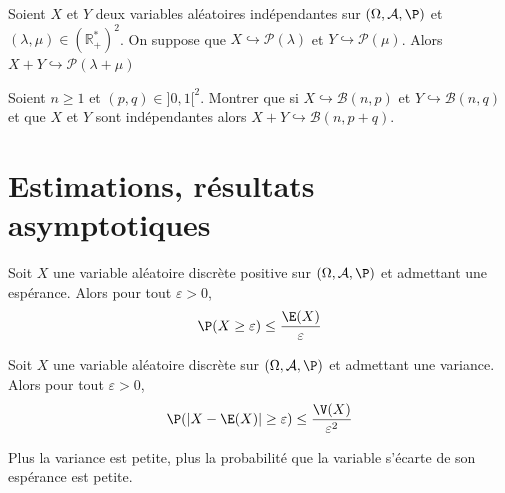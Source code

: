 \documentclass[a4paper,10pt]{report}
\begin{document}
\begin{cor} Soient $X$ et $Y$ deux variables aléatoires indépendantes sur $(\Omega, \mathcal{A}, \P)$ et $(\lambda, \mu) \in (\mathbb{R}_+^{*})^2$. On suppose que $X \hookrightarrow \mathcal{P}(\lambda)$ et $Y \hookrightarrow \mathcal{P}(\mu)$. Alors $X+Y \hookrightarrow \mathcal{P}(\lambda+\mu)$
\end{cor}

\begin{preuve}

\vspace{5cm}
\end{preuve}

\begin{exa} Soient $n \geq 1$ et $(p,q) \in ]0,1[^2$. Montrer que si $X \hookrightarrow \mathcal{B}(n,p)$ et $Y \hookrightarrow \mathcal{B}(n,q)$ et que $X$ et $Y$ sont indépendantes alors $X+Y \hookrightarrow \mathcal{B}(n,p+q)$.
\end{exa}

\section{Estimations, résultats asymptotiques}

\begin{thm}
Soit $X$ une variable aléatoire discrète positive sur $(\Omega, \mathcal{A}, \P)$ et admettant une espérance. Alors pour tout $\varepsilon>0$,
$$ \P(X \geq \varepsilon) \leq \dfrac{\E(X)}{\varepsilon}$$
\end{thm}

\begin{preuve}

\vspace{5cm}
\end{preuve}

\begin{thm}
Soit $X$ une variable aléatoire discrète sur $(\Omega, \mathcal{A}, \P)$ et admettant une variance. Alors pour tout $\varepsilon>0$,
$$ \P( \vert X- \E(X) \vert \geq \varepsilon) \leq \dfrac{\V(X)}{\varepsilon^2}$$
\end{thm}

\begin{preuve}
\vspace{5cm}
\end{preuve}

\begin{rem} Plus la variance est petite, plus la probabilité que la variable s'écarte de son espérance est petite.
\end{rem}
\end{document}

